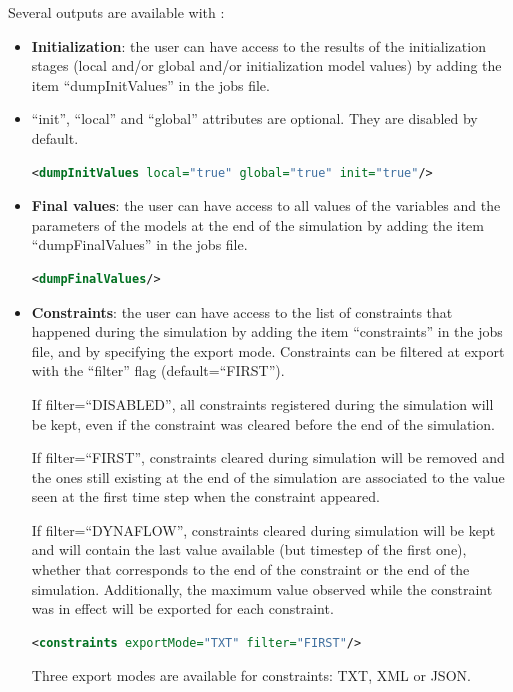 \documentclass[a4paper, 12pt]{report}
\begin{document}
Several outputs are available with \Dynawo:
\begin{itemize}
\item \textbf{Initialization}: the user can have access to the results of the initialization stages (local and/or global and/or initialization model values) by adding the item ``dumpInitValues'' in the jobs file.
\item ``init'', ``local'' and ``global'' attributes are optional. They are disabled by default.

\begin{lstlisting}[language=XML, morekeywords={dumpInitValues},numbers=none]
<dumpInitValues local="true" global="true" init="true"/>
\end{lstlisting}

\item \textbf{Final values}: the user can have access to all values of the variables and the parameters of the models at the end of the simulation by adding the item ``dumpFinalValues'' in the jobs file.

\begin{lstlisting}[language=XML, morekeywords={dumpFinalValues},numbers=none]
<dumpFinalValues/>
\end{lstlisting}

\item \textbf{Constraints}: the user can have access to the list of constraints that happened during the simulation by adding the item ``constraints'' in the jobs file, and by specifying the export mode.
Constraints can be filtered at export with the ``filter'' flag (default=``FIRST'').

If filter=``DISABLED'', all constraints registered during the simulation will be kept, even if the constraint was cleared before the end of the simulation.

If filter=``FIRST'', constraints cleared during simulation will be removed and the ones still existing at the end of the simulation are associated to the value seen at the first time step when the constraint appeared.

If filter=``DYNAFLOW'', constraints cleared during simulation will be kept and will contain the last value available (but timestep of the first one), whether that corresponds to the end of the constraint or the end of the simulation. Additionally, the maximum value observed while the constraint was in effect will be exported for each constraint.

\begin{lstlisting}[language=XML, morekeywords={constraints},numbers=none]
<constraints exportMode="TXT" filter="FIRST"/>
\end{lstlisting}
Three export modes are available for constraints: TXT, XML or JSON.


\end{itemize}
\end{document}
